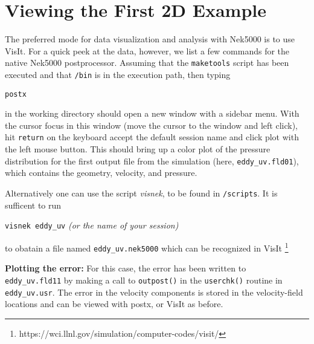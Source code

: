 \section{Viewing the First 2D Example}

The preferred mode for data visualization and analysis with Nek5000 is
to use VisIt.  For a quick
peek at the data, however, we list a few commands for the native Nek5000 
postprocessor.   Assuming that the {\tt maketools} script has been executed
and that {\tt /bin} is in the execution path, then typing 

\noindent
{\tt postx} 

\noindent
in the working directory should open a new window with a sidebar menu.
With the cursor focus in this window (move the cursor to the window and
left click), hit {\tt return} on the keyboard accept the default session name and click {\sc plot} with the left mouse button.  This should bring up
a color plot of the pressure distribution for the first output file
from the simulation (here, {\tt eddy\_uv.fld01}), which contains the
geometry, velocity, and pressure.  

Alternatively one can use the script \textit{visnek}, to be found in {\tt /scripts}. It is sufficent to run 

\noindent
{\tt visnek eddy\_uv}\textit{ (or the name of your session)}

to obatain a file named {\tt eddy\_uv.nek5000} which can be recognized in VisIt \footnote{https://wci.llnl.gov/simulation/computer-codes/visit/}


\begin{comment}
To see the vorticity at the final time, load the last output file,
{\tt eddy\_uv.fld12}, by clicking/typing the following in the postx window:
\begin{tabular}{r l l l}
  & {\bf click} \hspace*{1in} &{\bf type} \hspace*{1in} & {\bf comment} \\ \hline
1.& SET TIME         & 12 & load fld12 \\
2.& SET QUANTITY \\
3.& VORTICITY \\
4.& PLOT 
\end{tabular}
\end{comment}

{\bf Plotting the error:}
For this case, the error has been written to {\tt
eddy\_uv.fld11} by making a call to {\tt outpost()} in the {\tt userchk()}
routine in {\tt eddy\_uv.usr}.  The error in the velocity components
is stored in the velocity-field locations and can be viewed with 
postx, or VisIt as before.

